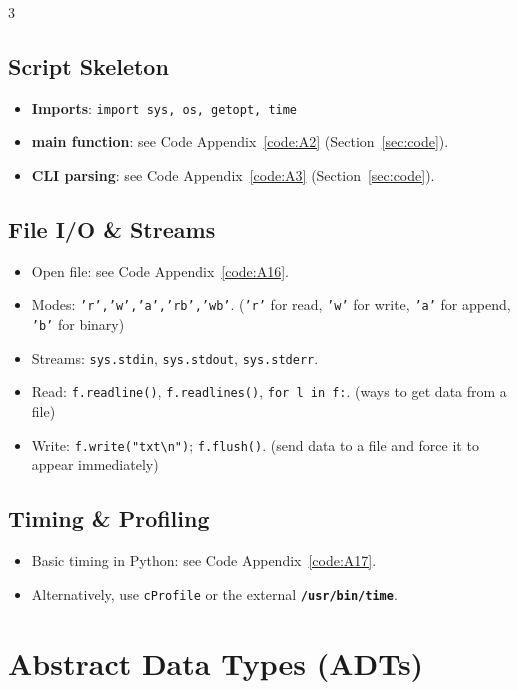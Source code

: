 \documentclass[6pt,landscape]{article}
\newcommand{\cmd}[1]{\textbf{\texttt{\textcolor{cmdcolor}{#1}}}}
\begin{document}
\begin{multicols}{3}
\subsection{Script Skeleton}\label{sec:skeleton}
\begin{itemize}
  \item \textbf{Imports}: \texttt{import sys, os, getopt, time}  
  \item \textbf{main function}: see Code Appendix~\ref{code:A2} (Section~\ref{sec:code}).  
  \item \textbf{CLI parsing}: see Code Appendix~\ref{code:A3} (Section~\ref{sec:code}). 
\end{itemize}

\subsection{File I/O \& Streams}\label{sec:fileio}
\begin{itemize}
  \item Open file: see Code Appendix~\ref{code:A16}.
  \item Modes: \texttt{'r','w','a','rb','wb'}.  (\texttt{'r'} for read, \texttt{'w'} for write, \texttt{'a'} for append, \texttt{'b'} for binary)
  \item Streams: \texttt{sys.stdin}, \texttt{sys.stdout}, \texttt{sys.stderr}.  
  \item Read: \texttt{f.readline()}, \texttt{f.readlines()}, \texttt{for l in f:}.  (ways to get data from a file)
  \item Write: \texttt{f.write("txt\textbackslash n")}; \texttt{f.flush()}.  (send data to a file and force it to appear immediately)
\end{itemize}

\subsection{Timing \& Profiling}\label{sec:timing}
\begin{itemize}
  \item Basic timing in Python: see Code Appendix~\ref{code:A17}.
  \item Alternatively, use \texttt{cProfile} or the external \cmd{/usr/bin/time}.
\end{itemize}

\section{Abstract Data Types (ADTs)}\label{sec:adts}


\end{multicols}
\end{document}
